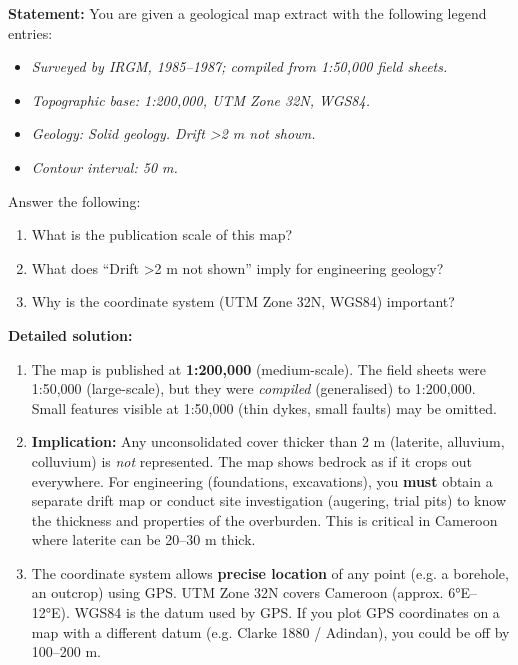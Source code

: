 \documentclass[11pt]{article}
\newcounter{popsec}
\newcounter{popsub}
\newcommand{\courssub}[1]{%
  \stepcounter{popsub}%
  \par\vspace{9pt}\noindent{\popxbold\fontsize{11.5}{13}\selectfont\color{popink}{\color{poporange}\thepopsec.\thepopsub}\hspace{6pt}#1}\par\nopagebreak\vspace{4pt}
}
\begin{document}
\begin{exoresolu}
\textbf{Statement:} You are given a geological map extract with the following legend entries:
\begin{itemize}
\item \emph{Surveyed by IRGM, 1985–1987; compiled from 1:50,000 field sheets.}
\item \emph{Topographic base: 1:200,000, UTM Zone 32N, WGS84.}
\item \emph{Geology: Solid geology. Drift >2 m not shown.}
\item \emph{Contour interval: 50 m.}
\end{itemize}
Answer the following:
\begin{enumerate}
\item What is the publication scale of this map?
\item What does ``Drift >2 m not shown'' imply for engineering geology?
\item Why is the coordinate system (UTM Zone 32N, WGS84) important?
\end{enumerate}

\tcblower
\textbf{Detailed solution:}
\begin{enumerate}
\item The map is published at \textbf{1:200,000} (medium-scale). The field sheets were 1:50,000 (large-scale), but they were \emph{compiled} (generalised) to 1:200,000. Small features visible at 1:50,000 (thin dykes, small faults) may be omitted.
\item \textbf{Implication:} Any unconsolidated cover thicker than 2 m (laterite, alluvium, colluvium) is \emph{not} represented. The map shows bedrock as if it crops out everywhere. For engineering (foundations, excavations), you \textbf{must} obtain a separate drift map or conduct site investigation (augering, trial pits) to know the thickness and properties of the overburden. This is critical in Cameroon where laterite can be 20–30 m thick.
\item The coordinate system allows \textbf{precise location} of any point (e.g. a borehole, an outcrop) using GPS. UTM Zone 32N covers Cameroon (approx. 6°E–12°E). WGS84 is the datum used by GPS. If you plot GPS coordinates on a map with a different datum (e.g. Clarke 1880 / Adindan), you could be off by 100–200 m.
\end{enumerate}
\end{exoresolu}

\courssub{Summary}
\end{document}
